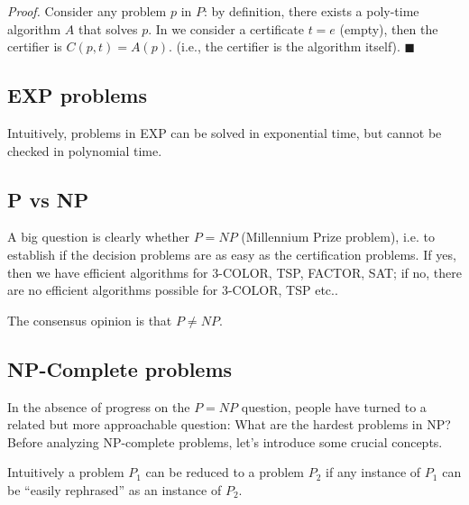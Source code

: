 
\textit{Proof.} Consider any problem $p$ in $P$: by definition, there exists a poly-time algorithm $A$ that solves $p$. In we consider a certificate $t = e$ (empty), then the certifier is $C (p, t) = A (p)$. (i.e., the certifier is the algorithm itself). $\blacksquare$

\subsection{EXP problems}

Intuitively, problems in EXP can be solved in exponential time, but cannot be checked in polynomial time.


\subsection{P vs NP}
A big question is clearly whether $P = NP$ (Millennium Prize problem), i.e. to establish if the decision problems are as easy as the certification problems. If yes, then we have efficient algorithms for 3-COLOR, TSP, FACTOR, SAT; if no, there are no efficient algorithms possible for 3-COLOR, TSP etc..


The consensus opinion is that $P \neq NP$.

\subsection{NP-Complete problems}
In the absence of progress on the $P = NP$ question, people have turned to a related but more approachable question: What are the hardest problems in NP? Before analyzing NP-complete problems, let's introduce some crucial concepts.


Intuitively a problem $P_1$ can be reduced to a problem $P_2$ if any instance of $P_1$ can be “easily rephrased” as an instance of $P_2$.


